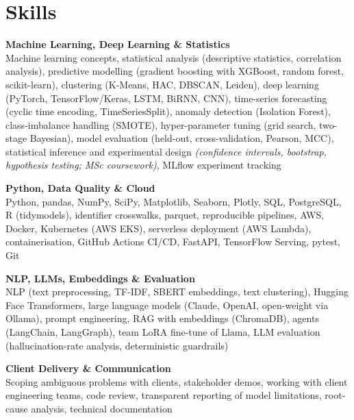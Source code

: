\documentclass[a4paper,11pt]{article}
\newcommand{\skillgroup}[2]{{\color{headernavy}\textbf{#1}}\\ #2\par\vspace{3pt}}
\begin{document}
\section{Skills}
\skillgroup{Machine Learning, Deep Learning \& Statistics}{Machine learning concepts, statistical analysis (descriptive statistics, correlation analysis), predictive modelling (gradient boosting with XGBoost, random forest, scikit-learn), clustering (K-Means, HAC, DBSCAN, Leiden), deep learning (PyTorch, TensorFlow/Keras, LSTM, BiRNN, CNN), time-series forecasting (cyclic time encoding, TimeSeriesSplit), anomaly detection (Isolation Forest), class-imbalance handling (SMOTE), hyper-parameter tuning (grid search, two-stage Bayesian), model evaluation (held-out, cross-validation, Pearson, MCC), statistical inference and experimental design \textit{(confidence intervals, bootstrap, hypothesis testing; MSc coursework)}, MLflow experiment tracking}
\skillgroup{Python, Data Quality \& Cloud}{Python, pandas, NumPy, SciPy, Matplotlib, Seaborn, Plotly, SQL, PostgreSQL, R (tidymodels), identifier crosswalks, parquet, reproducible pipelines, AWS, Docker, Kubernetes (AWS EKS), serverless deployment (AWS Lambda), containerisation, GitHub Actions CI/CD, FastAPI, TensorFlow Serving, pytest, Git}
\skillgroup{NLP, LLMs, Embeddings \& Evaluation}{NLP (text preprocessing, TF-IDF, SBERT embeddings, text clustering), Hugging Face Transformers, large language models (Claude, OpenAI, open-weight via Ollama), prompt engineering, RAG with embeddings (ChromaDB), agents (LangChain, LangGraph), team LoRA fine-tune of Llama, LLM evaluation (hallucination-rate analysis, deterministic guardrails)}
\skillgroup{Client Delivery \& Communication}{Scoping ambiguous problems with clients, stakeholder demos, working with client engineering teams, code review, transparent reporting of model limitations, root-cause analysis, technical documentation}
\end{document}
